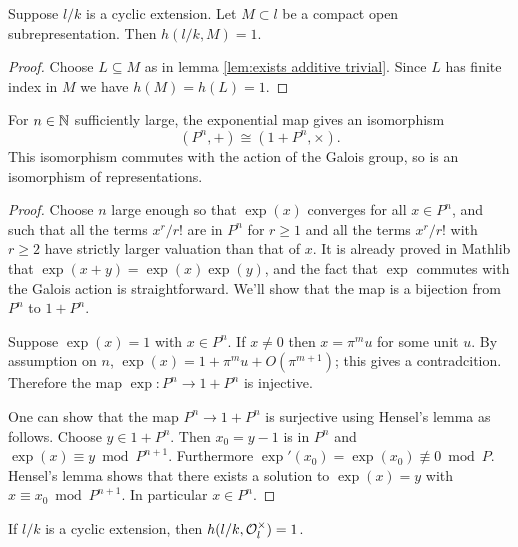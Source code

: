 \begin{lemma} \label{lem:herbrand compact open additive}
	Suppose $l/k$ is a cyclic extension.
	Let $M \subset l$ be a compact open subrepresentation.
	Then $h(l/k,M)=1$.
\end{lemma}

\begin{proof}
	Choose $L \subseteq M$ as in lemma \ref{lem:exists additive trivial}.
	Since $L$ has finite index in $M$ we have $h(M) = h(L) = 1$.
\end{proof}


\begin{lemma}\label{lem:local isomorphism}
	For $n \in {\mathbb N}$ sufficiently large, the
	exponential map gives an isomorphism
	\[
		(P^n,+) \cong (1 + P^n, \times).
	\]
	This isomorphism commutes with the action of the Galois group, so is an
	isomorphism of representations.
\end{lemma}

\begin{proof}
	Choose $n$ large enough so that $\exp(x)$ converges for all $x \in P^n$,
	and such that all the terms $x^r/r!$ are in $P^n$ for $r \ge 1$
	and all the terms $x^r / r!$ with $r \ge 2$ have strictly larger valuation than that of $x$.
	It is already proved in Mathlib that $\exp(x+y)=\exp(x)\exp(y)$, and the fact that $\exp$ commutes
	with the Galois action is straightforward.
	We'll show that the map is a bijection from $P^n$ to $1+P^n$.

	Suppose $\exp(x)=1$ with $x \in P^n$.
	If $x \ne 0$ then $x = \pi^mu$ for some unit $u$.
	By assumption on $n$, $\exp(x) = 1 + \pi^m u + O(\pi^{m+1})$; this gives a contradcition.
	Therefore the map $\exp : P^n \to 1+P^n$ is injective.

	One can show that the map $P^n \to 1+P^n$ is surjective using Hensel's lemma as follows.
	Choose $y \in 1+P^n$. Then $x_0 = y-1$ is in $P^n$ and $\exp(x) \equiv y \bmod P^{n+1}$.
	Furthermore $\exp'(x_0) = \exp(x_0) \not\equiv 0 \bmod P$. Hensel's lemma shows that there exists
	a solution to $\exp(x)=y$ with $x \equiv x_0 \bmod P^{n+1}$.
	In particular $x \in P^n$.
\end{proof}


\begin{lemma}\label{lem:herbrand local units}
	If $l/k$ is a cyclic extension, then $h(l/k, {\mathcal O}_l^\times) = 1$.
\end{lemma}

